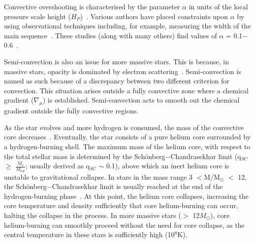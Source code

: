 Convective overshooting is characterised by the parameter $\alpha$ in units of the local pressure scale height ($H_{P}$)~\citep{b:KippenhahnWeigert}.
Various authors have placed constraints upon $\alpha$ by using observational techniques including, for example, measuring the width of the main sequence~\citep{Schroder97,Brott11}.
These studies (along with many others) find values of $\alpha$ = 0.1$-$0.6~\citep[a recent example is][finding $\alpha = 0.335$]{Brott11}.

Semi-convection is also an issue for more massive stars.
This is because, in massive stars, opacity is dominated by electron scattering~\citep{b:Bohm-vitense92.v3}.
Semi-convection is named as such because of a discrepancy between two different criterion for convection.
This situation arises outside a fully convective zone where a chemical gradient ($\nabla _{\mu}$) is established.
Semi-convection acts to smooth out the chemical gradient outside the fully convective regions.


As the star evolves and more hydrogen is consumed, the mass of the convective core decreases~\citep{b:KippenhahnWeigert}.
Eventually, the star consists of a pure helium core surrounded by a hydrogen-burning shell.
The maximum mass of the helium core, with respect to the total stellar mass is determined by the Sch\"onberg$-$Chandrasekhar limit (q$_{SC}$ $\geq$ $\frac{M_{c}}{M_{tot}}$; usually derived as q$_{SC}$ $\sim$ 0.1), above which an inert helium core is unstable to gravitational collapse.
In stars in the mass range 3 $<$M/M$_{\odot}$ $<$ 12, the Sch\"onberg$-$Chandrasekhar limit is usually reached at the end of the hydrogen-burning phase~\citep{b:SalarisCassisi05}.
At this point, the helium core collapses, increasing the core temperature and density sufficiently that core helium-burning can occur, halting the collapse in the process.
In more massive stars ($>$ 12$M_{\odot}$), core helium-burning can smoothly proceed without the need for core collapse, as the central temperature in these stars is sufficiently high (10$^{8}$K).

